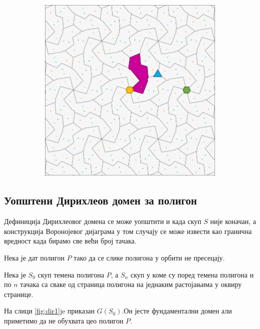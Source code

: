 \documentclass[12pt]{article}
\begin{document}
\begin{samepage}
\begin{figure}[H]
\begin{subfigure}[b]{0.32\textwidth}
    \label{fig:f5}
  \end{subfigure}
  \begin{subfigure}[b]{0.32\textwidth}
    \includegraphics[width=.9\textwidth]{dirh_4_tacke.png}
    \label{fig:f6}
  \end{subfigure}
\end{figure}
\caption{Примери уопштеног Дирихлеовог домена за више тачака}
\end{samepage}

    \subsection{Уопштени Дирихлеов домен за полигон}\label{modifikacija-fundamentalne-oblasti-na-osnovu-podfundamentalne}
Дефиниција Дирихлеовог домена се може уопштити и када скуп $S$ није коначан, а конструкција Воронојевог дијаграма у том случају се може извести као гранична вредност када бирамо све већи број тачака.

Нека је дат полигон $P$ тако да се слике полигона у орбити не пресецају. 


Нека је $S_0$ скуп темена полигона $P$, а $S_n$ скуп у коме су поред темена полигона и по $n$ тачака са сваке од страница полигона на једнаким растојањима у оквиру странице.

На слици \ref{fig:dir1}je приказан $G(S_0)$.Он јесте фундаментални домен али приметимо да не обухвата цео полигон $P$.
\end{document}
